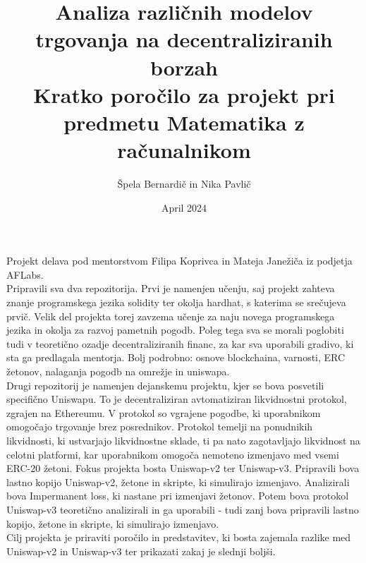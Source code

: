 \documentclass[a4paper,12pt]{article}%
\title{Analiza različnih modelov trgovanja na decentraliziranih borzah \\ \large Kratko poročilo za projekt pri predmetu Matematika z računalnikom}
\date{April 2024}
\author{Špela Bernardič in Nika Pavlič}
\begin{document}
\maketitle

Projekt delava pod mentorstvom Filipa Koprivca in Mateja Janežiča iz podjetja AFLabs. \\

Pripravili sva dva repozitorija. Prvi je namenjen učenju, saj projekt zahteva znanje programskega jezika solidity ter okolja hardhat, s katerima se srečujeva prvič. Velik del projekta torej zavzema učenje za naju novega programskega jezika in okolja za razvoj pametnih pogodb. Poleg tega sva se morali poglobiti tudi v teoretično ozadje decentraliziranih financ, za kar sva uporabili gradivo, ki sta ga predlagala mentorja. Bolj podrobno: osnove blockchaina, varnosti, ERC žetonov, nalaganja pogodb na omrežje in uniswapa.\\

Drugi repozitorij je namenjen dejanskemu projektu, kjer se bova posvetili specifično Uniswapu. To je decentraliziran avtomatiziran likvidnostni protokol, zgrajen na Ethereumu. V protokol so vgrajene pogodbe, ki uporabnikom omogočajo trgovanje brez posrednikov. Protokol temelji na ponudnikih likvidnosti, ki ustvarjajo likvidnostne sklade, ti pa nato zagotavljajo likvidnost na celotni platformi, kar uporabnikom omogoča nemoteno izmenjavo med vsemi ERC-20 žetoni. 
Fokus projekta bosta Uniswap-v2 ter Uniswap-v3. Pripravili bova lastno kopijo Uniswap-v2,  žetone in skripte, ki simulirajo izmenjavo. Analizirali bova Impermanent loss, ki nastane pri izmenjavi žetonov. Potem bova protokol Uniswap-v3 teoretično analizirali in ga uporabili - tudi zanj bova pripravili lastno kopijo, žetone in skripte, ki simulirajo izmenjavo. \\

Cilj projekta je priraviti poročilo in predstavitev, ki bosta zajemala razlike med Uniswap-v2 in Uniswap-v3 ter prikazati zakaj je slednji boljši. 
\end{document}
